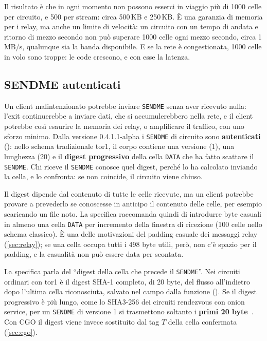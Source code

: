 Il risultato è che in ogni momento non possono esserci in viaggio più di 1000 celle per circuito, e 500 per stream: circa 500\,KB e 250\,KB. È una garanzia di memoria per i relay, ma anche un limite di velocità: un circuito con un tempo di andata e ritorno di mezzo secondo non può superare 1000 celle ogni mezzo secondo, circa 1\,MB/s, qualunque sia la banda disponibile. E se la rete è congestionata, 1000 celle in volo sono troppe: le code crescono, e con esse la latenza.

\subsection{SENDME autenticati}

Un client malintenzionato potrebbe inviare \texttt{SENDME} senza aver ricevuto nulla: l'exit continuerebbe a inviare dati, che si accumulerebbero nella rete, e il client potrebbe così esaurire la memoria dei relay, o amplificare il traffico, con uno sforzo minimo. Dalla versione 0.4.1.1-alpha i \texttt{SENDME} di circuito sono \textbf{autenticati} (): nello schema tradizionale tor1, il corpo contiene una versione (1), una lunghezza (20) e il \textbf{digest progressivo} della cella \texttt{DATA} che ha fatto scattare il \texttt{SENDME}. Chi riceve il \texttt{SENDME} conosce quel digest, perché lo ha calcolato inviando la cella, e lo confronta: se non coincide, il circuito viene chiuso.

Il digest dipende dal contenuto di tutte le celle ricevute, ma un client potrebbe provare a prevederlo se conoscesse in anticipo il contenuto delle celle, per esempio scaricando un file noto. La specifica  raccomanda quindi di introdurre byte casuali in almeno una cella \texttt{DATA} per incremento della finestra di ricezione (100 celle nello schema classico). È una delle motivazioni del padding casuale dei messaggi relay (\cref{sec:relay}); se una cella occupa tutti i 498 byte utili, però, non c'è spazio per il padding, e la casualità non può essere data per scontata.

\begin{approfondimento}
La specifica parla del \enquote{digest della cella che precede il \texttt{SENDME}}. Nei circuiti ordinari con tor1 è il digest SHA-1 completo, di 20 byte, del flusso all'indietro dopo l'ultima cella riconosciuta, salvato nel campo  dalla funzione  (). Se il digest progressivo è più lungo, come lo SHA3-256 dei circuiti rendezvous con onion service, per un \texttt{SENDME} di versione 1 si trasmettono soltanto i \textbf{primi 20 byte}~. Con CGO il digest viene invece sostituito dal tag $T$ della cella confermata (\cref{sec:cgo}).
\end{approfondimento}

